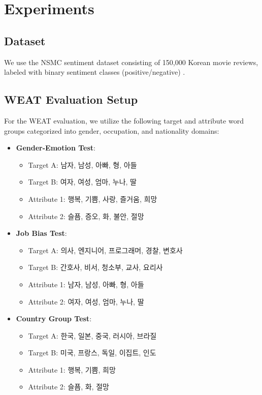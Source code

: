 \documentclass{article}
\begin{document}
\section{Experiments}
\subsection{Dataset}
We use the NSMC sentiment dataset consisting of 150,000 Korean movie reviews, labeled with binary sentiment classes (positive/negative) \cite{nsmc2016}.

\subsection{WEAT Evaluation Setup}
For the WEAT evaluation, we utilize the following target and attribute word groups categorized into gender, occupation, and nationality domains:

\begin{itemize}
\item \textbf{Gender-Emotion Test}:
\begin{itemize}
    \item Target A: 남자, 남성, 아빠, 형, 아들
    \item Target B: 여자, 여성, 엄마, 누나, 딸
    \item Attribute 1: 행복, 기쁨, 사랑, 즐거움, 희망
    \item Attribute 2: 슬픔, 증오, 화, 불안, 절망
\end{itemize}

\item \textbf{Job Bias Test}:
\begin{itemize}
    \item Target A: 의사, 엔지니어, 프로그래머, 경찰, 변호사
    \item Target B: 간호사, 비서, 청소부, 교사, 요리사
    \item Attribute 1: 남자, 남성, 아빠, 형, 아들
    \item Attribute 2: 여자, 여성, 엄마, 누나, 딸
\end{itemize}

\item \textbf{Country Group Test}:
\begin{itemize}
    \item Target A: 한국, 일본, 중국, 러시아, 브라질
    \item Target B: 미국, 프랑스, 독일, 이집트, 인도
    \item Attribute 1: 행복, 기쁨, 희망
    \item Attribute 2: 슬픔, 화, 절망
\end{itemize}
\end{itemize}
\end{document}
